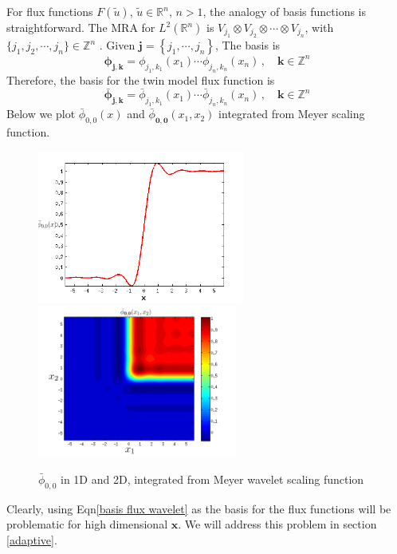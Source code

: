 \documentclass[a4paper,onecolumn]{article}
\theoremstyle{remark}
\begin{document}
\noindent For flux functions $F(\tilde{u})$, $\tilde{u}\in \mathbb{R}^n$, $n>1$, the analogy of
basis functions is straightforward.
The MRA for $L^2(\mathbb{R}^n)$ is 
$V_{j_1}\otimes V_{j_2}\otimes \cdots \otimes V_{j_n}$, with
$\{j_1,j_2,\cdots,j_n\}\in \mathbb{Z}^n$ \cite{wavelet mallat, Dijkema book}.
Given $\mathbf{j} = \left\{j_1,\cdots,j_n\right\}$, The basis is
\begin{equation}
   \mathbf{\phi}_{\mathbf{j},\mathbf{k}} = \phi_{j_1,k_1}(x_1)\cdots \phi_{j_n,k_n}(x_n)\,,
   \quad \mathbf{k}\in\mathbb{Z}^n
\end{equation}
Therefore, the basis for the twin model flux function is
\begin{equation}
   \bar{\mathbf{\phi}}_{\mathbf{j},\mathbf{k}} = \bar{\phi}_{j_1,k_1}(x_1)
   \cdots \bar{\phi}_{j_n,k_n}(x_n)\,,
   \quad \mathbf{k}\in\mathbb{Z}^n
   \label{basis flux wavelet}
\end{equation}
Below we plot $\bar{\phi}_{0,0}(x)$ and $\bar{\phi}_{\mathbf{0},\mathbf{0}}(x_1,x_2)$ 
integrated from Meyer scaling function.
\begin{figure}[H]\begin{center}
    \includegraphics[height=5cm]{basis.png}
    \includegraphics[height=5cm]{basis_2D.png}
\end{center}
\caption{$\bar{\phi}_{0,0}$ in 1D and 2D, integrated from Meyer wavelet scaling function}
\label{fig:Meyer Basis}
\end{figure}
\noindent Clearly, using Eqn\eqref{basis flux wavelet} as the basis for the flux functions
will be problematic for high dimensional $\mathbf{x}$. We will address this problem
in section \ref{adaptive}.\\
\end{document}
